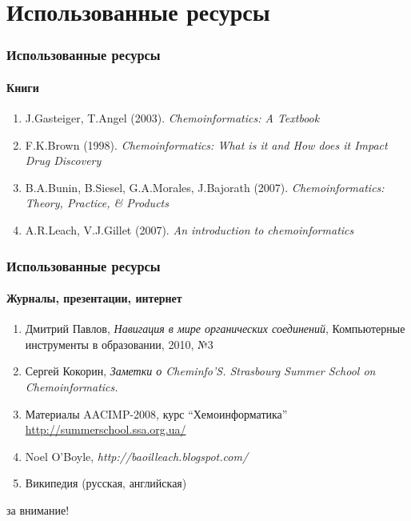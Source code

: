 \section{Использованные ресурсы}

\begin{frame}
  \frametitle{Использованные ресурсы}
  \framesubtitle{Книги}
  \begin{enumerate}
    \item J.Gasteiger, T.Angel (2003). \emph{Chemoinformatics: A Textbook}     
    \item F.K.Brown (1998). \emph{Chemoinformatics: What is it and How does it Impact Drug Discovery}
    \item B.A.Bunin, B.Siesel, G.A.Morales, J.Bajorath (2007). \emph{Chemoinformatics: Theory, Practice, \& Products}
    \item A.R.Leach, V.J.Gillet (2007). \emph{An introduction to chemoinformatics}
  \end{enumerate}
\end{frame}

\begin{frame}
  \frametitle{Использованные ресурсы}
  \framesubtitle{Журналы, презентации, интернет}
  \begin{enumerate}
    \item Дмитрий Павлов, \emph{Навигация в мире органических соединений}, Компьютерные инструменты в образовании, 2010, №3 
    \item Сергей Кокорин, \emph{Заметки о Cheminfo'S. Strasbourg Summer School on Chemoinformatics.} 
    \item Материалы AACIMP-2008, курс ``Хемоинформатика'' \\ 
	       \url{http://summerschool.ssa.org.ua/}
    \item Noel O'Boyle, \emph{http://baoilleach.blogspot.com/}
    \item Википедия (русская, английская)
   \end{enumerate}

\end{frame}

\begin{frame}
   \begin{center}
    за внимание!
   \end{center}
\end{frame}




